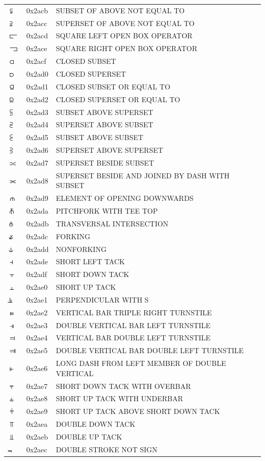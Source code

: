 \documentclass[12pt, twoside]{article}
\begin{document}
\begin{longtable}{L{1.0cm} L{2.0cm} >{\footnotesize}L{10cm}}
$⫋$&0x2acb&SUBSET OF ABOVE NOT EQUAL TO\\
$⫌$&0x2acc&SUPERSET OF ABOVE NOT EQUAL TO\\
$⫍$&0x2acd&SQUARE LEFT OPEN BOX OPERATOR\\
$⫎$&0x2ace&SQUARE RIGHT OPEN BOX OPERATOR\\
$⫏$&0x2acf&CLOSED SUBSET\\
$⫐$&0x2ad0&CLOSED SUPERSET\\
$⫑$&0x2ad1&CLOSED SUBSET OR EQUAL TO\\
$⫒$&0x2ad2&CLOSED SUPERSET OR EQUAL TO\\
$⫓$&0x2ad3&SUBSET ABOVE SUPERSET\\
$⫔$&0x2ad4&SUPERSET ABOVE SUBSET\\
$⫕$&0x2ad5&SUBSET ABOVE SUBSET\\
$⫖$&0x2ad6&SUPERSET ABOVE SUPERSET\\
$⫗$&0x2ad7&SUPERSET BESIDE SUBSET\\
$⫘$&0x2ad8&SUPERSET BESIDE AND JOINED BY DASH WITH SUBSET\\
$⫙$&0x2ad9&ELEMENT OF OPENING DOWNWARDS\\
$⫚$&0x2ada&PITCHFORK WITH TEE TOP\\
$⫛$&0x2adb&TRANSVERSAL INTERSECTION\\
$⫝̸$&0x2adc&FORKING\\
$⫝$&0x2add&NONFORKING\\
$⫞$&0x2ade&SHORT LEFT TACK\\
$⫟$&0x2adf&SHORT DOWN TACK\\
$⫠$&0x2ae0&SHORT UP TACK\\
$⫡$&0x2ae1&PERPENDICULAR WITH S\\
$⫢$&0x2ae2&VERTICAL BAR TRIPLE RIGHT TURNSTILE\\
$⫣$&0x2ae3&DOUBLE VERTICAL BAR LEFT TURNSTILE\\
$⫤$&0x2ae4&VERTICAL BAR DOUBLE LEFT TURNSTILE\\
$⫥$&0x2ae5&DOUBLE VERTICAL BAR DOUBLE LEFT TURNSTILE\\
$⫦$&0x2ae6&LONG DASH FROM LEFT MEMBER OF DOUBLE VERTICAL\\
$⫧$&0x2ae7&SHORT DOWN TACK WITH OVERBAR\\
$⫨$&0x2ae8&SHORT UP TACK WITH UNDERBAR\\
$⫩$&0x2ae9&SHORT UP TACK ABOVE SHORT DOWN TACK\\
$⫪$&0x2aea&DOUBLE DOWN TACK\\
$⫫$&0x2aeb&DOUBLE UP TACK\\
$⫬$&0x2aec&DOUBLE STROKE NOT SIGN\\

\end{longtable}
\end{document}
